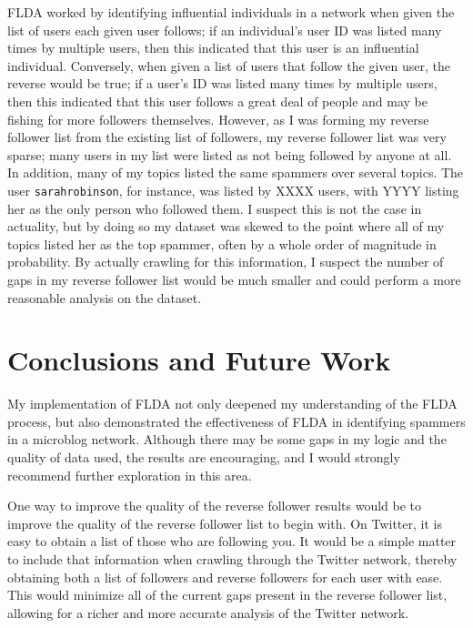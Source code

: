 \documentclass[a4paper]{article}
\begin{document}
FLDA worked by identifying influential individuals in a network when given the list of users each given user follows; if an individual's user ID was listed many times by multiple users, then this indicated that this user is an influential individual. Conversely, when given a list of users that follow the given user, the reverse would be true; if a user's ID was listed many times by multiple users, then this indicated that this user follows a great deal of people and may be fishing for more followers themselves. However, as I was forming my reverse follower list from the existing list of followers, my reverse follower list was very sparse; many users in my list were listed as not being followed by anyone at all. In addition, many of my topics listed the same spammers over several topics. The user \verb+sarahrobinson+, for instance, was listed by XXXX users, with YYYY listing her as the only person who followed them. I suspect this is not the case in actuality, but by doing so my dataset was skewed to the point where all of my topics listed her as the top spammer, often by a whole order of magnitude in probability. By actually crawling for this information, I suspect the number of gaps in my reverse follower list would be much smaller and could perform a more reasonable analysis on the dataset.

\section{Conclusions and Future Work}
\label{sec:conc}
My implementation of FLDA not only deepened my understanding of the FLDA process, but also demonstrated the effectiveness of FLDA in identifying spammers in a microblog network. Although there may be some gaps in my logic and the quality of data used, the results are encouraging, and I would strongly recommend further exploration in this area.

One way to improve the quality of the reverse follower results would be to improve the quality of the reverse follower list to begin with. On Twitter, it is easy to obtain a list of those who are following you. It would be a simple matter to include that information when crawling through the Twitter network, thereby obtaining both a list of followers and reverse followers for each user with ease. This would minimize all of the current gaps present in the reverse follower list, allowing for a richer and more accurate analysis of the Twitter network.
\end{document}
